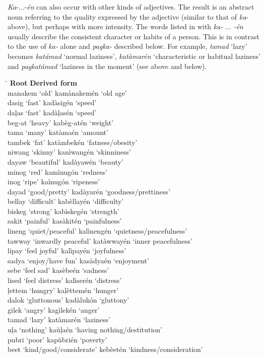 \textit{Ka}{}-...-\textit{én} can also occur with other kinds of adjectives. The result is an abstract noun referring to the quality expressed by the adjective (similar to that of \textit{ka}{}- above), but perhaps with more intensity. The words listed in  with \textit{ka-} ... \textit{{}-én} usually describe the consistent character or habits of a person. This is in contrast to the use of \textit{ka-} alone and \textit{pagka-} described below. For example, \textit{tamad} ‘lazy’ becomes \textit{katámad} ‘normal laziness’, \textit{katàmarén} ‘characteristic or habitual laziness’ and \textit{pagkatámad} ‘laziness in the moment’ (see  above and  below).
\ea
\label{ex:oldage}
\begin{tabbing}
\hspace{4.5cm} \= \kill
\textbf{Root} \> \textbf{Derived form} \\
manakem ‘old’ \> kamànakemén ‘old age’ \\
dasig ‘fast’ \> kadàsigén ‘speed’ \\
daļas ‘fast’ \> kadàļasén ‘speed’ \\
beg-at ‘heavy’ \> kabèg-atén ‘weight’ \\
tama ‘many’ \> katàmaén ‘amount’ \\
tambek ‘fat’ \> katàmbekén ‘fatness/obesity’ \\
niwang ‘skinny’ \> kanìwangén ‘skinniness’ \\
dayaw ‘beautiful’ \> kadàyawén ‘beauty’ \\
minog ‘red’ \> kamìnugón ‘redness’ \\
inog ‘ripe’ \> kaìnugón ‘ripeness’ \\
dayad ‘good/pretty’ \> kadàyarén ‘goodness/prettiness’ \\
bellay ‘difficult’ \>  kabèllayén ‘difficulty’ \\
biskeg ‘strong’ \>  kabìskegén ‘strength’ \\
sakit ‘painful’ \>  kasàkitén ‘painfulness’ \\
lineng ‘quiet/peaceful’ \>  kalìnengén ‘quietness/peacefulness’ \\
tawway ‘inwardly peaceful’ \>  katàwwayén ‘inner peacefulness’ \\
lipay ‘feel joyful’ \>  kalìpayén ‘joyfulness’ \\
sadya ‘enjoy/have fun’ \>  kasàdyaén ‘enjoyment’ \\
sebe ‘feel sad’ \>  kasèbeén ‘sadness’ \\
lised ‘feel distress’ \>  kalìserén ‘distress’ \\
ļettem ‘hungry’ \>  kaļèttemén ‘hunger’ \\
dalok ‘gluttonous’ \>  kadàlukón ‘gluttony’ \\
gilek ‘angry’ \>  kagìlekén ‘anger’ \\
tamad ‘lazy’ \> katàmarén ‘laziness’ \\
uļa ‘nothing’ \> kaùļaén ‘having nothing/destitution’ \\
pubri ‘poor’ \> kapùbrién ‘poverty’ \\
beet ‘kind/good/considerate’ \> kebèetén ‘kindness/consideration’
\end{tabbing}
\z

